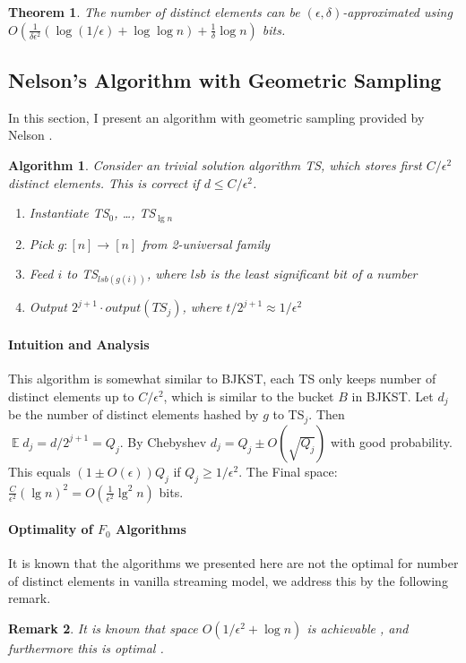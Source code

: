 \documentclass[11pt]{article}
\theoremstyle{plain}
\newtheorem{theorem}{Theorem}[section]
\newtheorem{algorithm}{Algorithm}[section]
\newtheorem{remark}[theorem]{Remark}
\DeclareMathOperator*{\E}{\mathbb{E}}
\begin{document}
\begin{theorem}
	\label{th:bjkst}
	The number of distinct elements can be $(\epsilon,\delta)$-approximated 
	using  $O(\frac{1}{\delta\epsilon^2}(\log(1/\epsilon)+\log\log 
	n)+\frac{1}{\delta}\log n)$ bits.
\end{theorem}

\subsection{Nelson's Algorithm with Geometric Sampling}
In this section, I present an algorithm with geometric sampling provided by 
Nelson  \cite{Nel2015-web}. 

\begin{algorithm}
Consider an trivial solution algorithm TS, which stores first $C/\epsilon^2$ 
distinct elements. This is correct if $d \leq C/\epsilon^2$.
\begin{enumerate}
	\item Instantiate TS$_0$, \dots, TS$_{\lg n}$
	\item Pick $g : [n] \to [n]$ from 2-universal family
	\item Feed $i$ to TS$_{lsb(g(i))}$, where $lsb$ is the least significant bit of 
	a number
	\item Output $2^{j+1}\cdot output(TS_j)$, where $t/2^{j+1}\approx 
	1/\epsilon^2$
\end{enumerate}
\end{algorithm}


\paragraph{Intuition and Analysis}
This algorithm is somewhat similar to BJKST, each TS only keeps number of 
distinct elements up to $C/\epsilon^2$, which is similar to the bucket $B$ in 
BJKST. Let $d_j$ be the number of distinct elements hashed by $g$ to 
TS$_j$. Then $\E d_j = d/2^{j+1} = Q_j$. By Chebyshev $d_j = Q_j \pm 
O(\sqrt{Q_j})$ with good probability. This equals $(1 \pm O(\epsilon)) Q_j$ if 
$Q_j \geq 1/\epsilon^2$. The Final space: $\frac{C}{\epsilon^2} (\lg n)^2 = 
O(\frac 1{\epsilon^2} \lg^2 
n)$ bits.

\paragraph{Optimality of $F_0$ Algorithms}
It is known that the algorithms we presented here are not the optimal for 
number of distinct elements in vanilla streaming model, we address this by 
the following remark. 
\begin{remark}
\label{re:f0optimal}
It is known that space $O(1/\epsilon^2 + \log n)$ is achievable  \cite{KNW10}, 
and furthermore this is optimal  \cite{Woodruff04}  \cite{AMS99}.
\end{remark}
\end{document}

